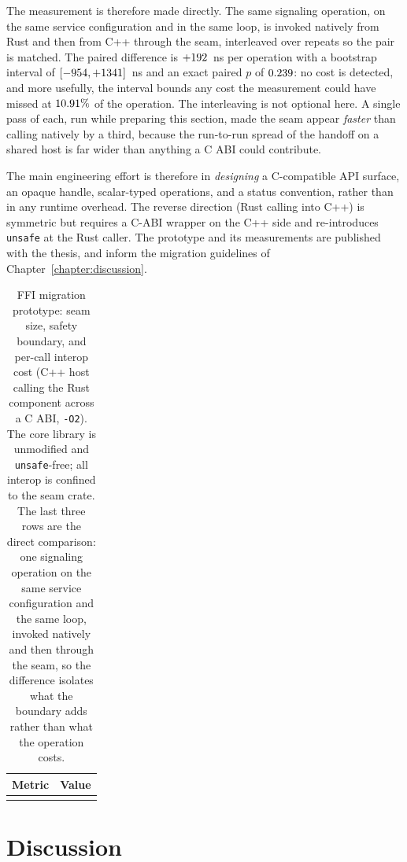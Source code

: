 \documentclass[english,twoside,openright,a4paper,censored,csm,software-track-2020]{HYthesisML}
\begin{document}
The measurement is therefore made directly. The same signaling operation, on the same service
configuration and in the same loop, is invoked natively from Rust and then from C++ through the
seam, interleaved over \FfiOpRepeats{} repeats so the pair is matched. The paired difference is
$+192$~ns per operation with a bootstrap interval of $[-954, +1341]$~ns
and an exact paired $p$ of $0.239$: no cost is detected, and more usefully, the interval
bounds any cost the measurement could have missed at $10.91\%$ of the operation. The
interleaving is not optional here. A single pass of each, run while preparing this section,
made the seam appear \emph{faster} than calling natively by a third, because the run-to-run
spread of the handoff on a shared host is far wider than anything a C ABI could contribute.

The main engineering effort is therefore in \emph{designing} a C-compatible API
surface, an opaque handle, scalar-typed operations, and a status convention, rather than in
any runtime overhead. The reverse direction (Rust calling into C++) is symmetric but requires
a C-ABI wrapper on the C++ side and re-introduces \texttt{unsafe} at the Rust caller. The
prototype and its measurements are published with the thesis, and inform the migration
guidelines of Chapter~\ref{chapter:discussion}.

\begin{table}
\centering
\caption[FFI migration prototype: seam size, safety, and cost]{FFI migration prototype: seam size, safety boundary, and per-call interop cost
(C++ host calling the Rust component across a C ABI, \texttt{-O2}). The core library is
unmodified and \texttt{unsafe}-free; all interop is confined to the seam crate. The last
three rows are the direct comparison: one signaling operation on the same service
configuration and the same loop, invoked natively and then through the seam, so the
difference isolates what the boundary adds rather than what the operation
costs.\label{tab:ffi}}
\begin{tabular}{l r}
\hline\hline
Metric & Value \\
\hline
\\
\hline
\end{tabular}
\end{table}

\chapter{Discussion\label{chapter:discussion}}
\end{document}
